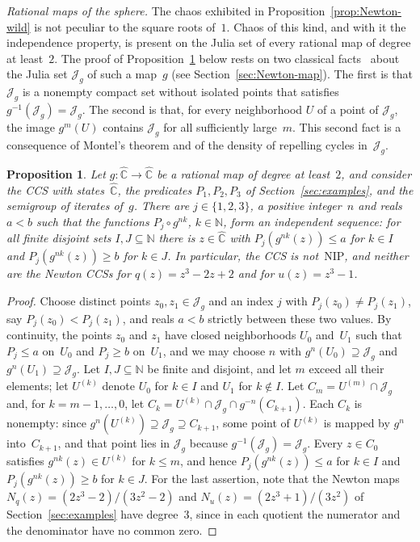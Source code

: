 \documentclass[psamsfonts]{amsart}
\newtheorem{prop}[thm]{Proposition}
\theoremstyle{definition}
\theoremstyle{remark}
\newcommand{\hatC}{\hat{\mathbb{C}}}
\newcommand{\NIP}{\text{NIP}}
\numberwithin{equation}{section}
\begin{document}
\emph{Rational maps of the sphere.}
The chaos exhibited in Proposition~\ref{prop:Newton-wild} is not peculiar to the square roots of~$1$.
Chaos of this kind, and with it the independence property, is present on the Julia set of every rational map of degree at least~$2$.
The proof of Proposition~\ref{prop:rational-IP} below rests on two classical facts~\cite[Sections~4 and~14]{Milnor2006} about the Julia set $\mathcal{J}_g$ of such a map~$g$ (see Section~\ref{sec:Newton-map}).
The first is that $\mathcal{J}_g$ is a nonempty compact set without isolated points that satisfies $g^{-1}(\mathcal{J}_g)=\mathcal{J}_g$.
The second is that, for every neighborhood $U$ of a point of $\mathcal{J}_g$, the image $g^m(U)$ contains $\mathcal{J}_g$ for all sufficiently large~$m$.
This second fact is a consequence of Montel's theorem and of the density of repelling cycles in~$\mathcal{J}_g$.

\begin{prop}\label{prop:rational-IP}
Let $g\colon\hatC\to\hatC$ be a rational map of degree at least~$2$, and consider the CCS with states~$\hatC$, the predicates $P_1,P_2,P_3$ of Section~\ref{sec:examples}, and the semigroup of iterates of~$g$.
There are $j\in\{1,2,3\}$, a positive integer~$n$ and reals $a<b$ such that the functions $P_j\circ g^{nk}$, $k\in\mathbb{N}$, form an independent sequence:
for all finite disjoint sets $I,J\subseteq\mathbb{N}$ there is $z\in\hatC$ with $P_j(g^{nk}(z))\le a$ for $k\in I$ and $P_j(g^{nk}(z))\ge b$ for $k\in J$.
In particular, the CCS is not~$\NIP$, and neither are the Newton CCSs for $q(z)=z^3-2z+2$ and for $u(z)=z^3-1$.
\end{prop}

\begin{proof}
Choose distinct points $z_0,z_1\in\mathcal{J}_g$ and an index $j$ with $P_j(z_0)\neq P_j(z_1)$, say $P_j(z_0)<P_j(z_1)$, and reals $a<b$ strictly between these two values.
By continuity, the points $z_0$ and $z_1$ have closed neighborhoods $U_0$ and~$U_1$ such that $P_j\le a$ on~$U_0$ and $P_j\ge b$ on~$U_1$, and we may choose $n$ with $g^n(U_0)\supseteq\mathcal{J}_g$ and $g^n(U_1)\supseteq\mathcal{J}_g$.
Let $I,J\subseteq\mathbb{N}$ be finite and disjoint, and let $m$ exceed all their elements;
let $U^{(k)}$ denote $U_0$ for $k\in I$ and $U_1$ for $k\notin I$.
Let $C_m=U^{(m)}\cap\mathcal{J}_g$ and, for $k=m-1,\dots,0$, let $C_k=U^{(k)}\cap\mathcal{J}_g\cap g^{-n}(C_{k+1})$.
Each $C_k$ is nonempty: since $g^n(U^{(k)})\supseteq\mathcal{J}_g\supseteq C_{k+1}$, some point of $U^{(k)}$ is mapped by $g^n$ into~$C_{k+1}$, and that point lies in $\mathcal{J}_g$ because $g^{-1}(\mathcal{J}_g)=\mathcal{J}_g$.
Every $z\in C_0$ satisfies $g^{nk}(z)\in U^{(k)}$ for $k\le m$, and hence $P_j(g^{nk}(z))\le a$ for $k\in I$ and $P_j(g^{nk}(z))\ge b$ for $k\in J$.
For the last assertion, note that the Newton maps $N_q(z)=(2z^3-2)/(3z^2-2)$ and $N_u(z)=(2z^3+1)/(3z^2)$ of Section~\ref{sec:examples} have degree~$3$, since in each quotient the numerator and the denominator have no common zero.
\end{proof}
\end{document}
